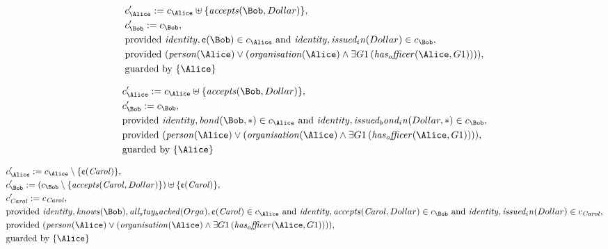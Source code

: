\begin{align*}
&
c'_
{
\Alice
}
 := 
c_
{
\Alice
}
 \uplus 
\{
\mathit{
accepts
}
(
\Bob
,
Dollar
)
\}
,\\
&
c'_
{
\Bob
}
 := 
c_
{
\Bob
}
,\\
&
\text{provided } 
\mathit{
identity
}
,
\text{\textcent}
(
\Bob
)
 \in c_
{
\Alice
}
 \text{ and } 
\mathit{
identity
}
,
\mathit{
issued_in
}
(
Dollar
)
 \in c_
{
\Bob
}
,\\
&
\text{provided } 
(
\mathit{
person
}
(
\Alice
)
\lor
(
\mathit{
organisation
}
(
\Alice
)
\land
\exists 
G1
\,(
\mathit{
has_officer
}
(
\Alice
,
G1
)
)
)
)
,\\
&
\text{guarded by } \{
\Alice
\}
\end{align*}

\begin{align*}
&
c'_
{
\Alice
}
 := 
c_
{
\Alice
}
 \uplus 
\{
\mathit{
accepts
}
(
\Bob
,
Dollar
)
\}
,\\
&
c'_
{
\Bob
}
 := 
c_
{
\Bob
}
,\\
&
\text{provided } 
\mathit{
identity
}
,
\mathit{
bond
}
(
\Bob
,
\ast
)
 \in c_
{
\Alice
}
 \text{ and } 
\mathit{
identity
}
,
\mathit{
issued_bond_in
}
(
Dollar
,
\ast
)
 \in c_
{
\Bob
}
,\\
&
\text{provided } 
(
\mathit{
person
}
(
\Alice
)
\lor
(
\mathit{
organisation
}
(
\Alice
)
\land
\exists 
G1
\,(
\mathit{
has_officer
}
(
\Alice
,
G1
)
)
)
)
,\\
&
\text{guarded by } \{
\Alice
\}
\end{align*}

\begin{align*}
&
c'_
{
\Alice
}
 := 
c_
{
\Alice
}
 \setminus 
\{
\text{\textcent}
(
\mathit{Carol}
)
\}
,\\
&
c'_
{
\Bob
}
 := 
(c_
{
\Bob
}
 \setminus 
\{
\mathit{
accepts
}
(
\mathit{Carol}
,
Dollar
)
\}
) \uplus 
\{
\text{\textcent}
(
\mathit{Carol}
)
\}
,\\
&
c'_
{
\mathit{Carol}
}
 := 
c_
{
\mathit{Carol}
}
,\\
&
\text{provided } 
\mathit{
identity
}
,
\mathit{
knows
}
(
\Bob
)
,
\mathit{
all_stay_backed
}
(
Orga
)
,
\text{\textcent}
(
\mathit{Carol}
)
 \in c_
{
\Alice
}
 \text{ and } 
\mathit{
identity
}
,
\mathit{
accepts
}
(
\mathit{Carol}
,
Dollar
)
 \in c_
{
\Bob
}
 \text{ and } 
\mathit{
identity
}
,
\mathit{
issued_in
}
(
Dollar
)
 \in c_
{
\mathit{Carol}
}
,\\
&
\text{provided } 
(
\mathit{
person
}
(
\Alice
)
\lor
(
\mathit{
organisation
}
(
\Alice
)
\land
\exists 
G1
\,(
\mathit{
has_officer
}
(
\Alice
,
G1
)
)
)
)
,\\
&
\text{guarded by } \{
\Alice
\}
\end{align*}
